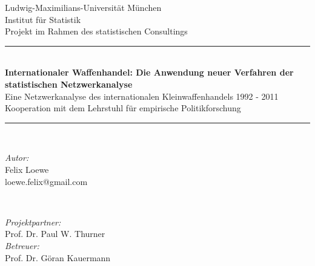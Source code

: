 \documentclass[a4paper,ngerman,oneside,titlepage,bibliography=totoc,11pt]{scrreprt}
\begin{document}
\begin{titlepage}

\newcommand{\HRule}{\rule{\linewidth}{0.5mm}} %

\center %
 

\LARGE Ludwig-Maximilians-Universität München\\[0.2cm] %
\LARGE Institut für Statistik\\[5mm]%
\large Projekt im Rahmen des statistischen Consultings\\[6mm]


\HRule \\[0.4cm]
{ \huge \bfseries Internationaler Waffenhandel:\vspace{-1.5mm} Die Anwendung neuer Verfahren der\\[1mm] statistischen Netzwerkanalyse}\\[5mm]
{ Eine Netzwerkanalyse des internationalen Kleinwaffenhandels 1992 - 2011}\\
{ Kooperation mit dem Lehrstuhl für empirische Politikforschung}\\[0.4cm] %
\HRule \\[1.5cm]
 

\begin{minipage}[t]{0.4\textwidth}
\begin{flushleft} \large
\emph{Autor:}\\[2mm]
Felix Loewe\\
loewe.felix@gmail.com\\[5mm]


\end{flushleft}
\end{minipage}
~
\begin{minipage}[t]{0.4\textwidth}
\begin{flushright} \large
\emph{Projektpartner:}\\[2mm]
Prof. Dr. Paul W. Thurner\\[6mm]

\emph{Betreuer:}\\[2mm]
Prof. Dr. Göran Kauermann\\[6mm]
\end{flushright}
\end{minipage}\\[4.5cm]

\end{titlepage}
\end{document}

